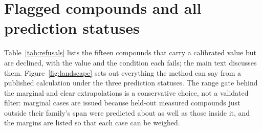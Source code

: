 \documentclass[preprint, 12pt]{elsarticle}
\begin{document}
\section{Flagged compounds and all prediction statuses}
\label{sec:flagged}

Table~\ref{tab:refusals} lists the fifteen compounds that carry a calibrated value but are declined,
with the value and the condition each fails; the main text discusses them. Figure~\ref{fig:landscape}
sets out everything the method can say from a published calculation under the three prediction
statuses. The range gate behind the marginal and clear extrapolations is a conservative choice, not a
validated filter: marginal cases are issued because held-out measured compounds just outside their
family's span were predicted about as well as those inside it, and the margins are listed so that
each case can be weighed.
\end{document}

